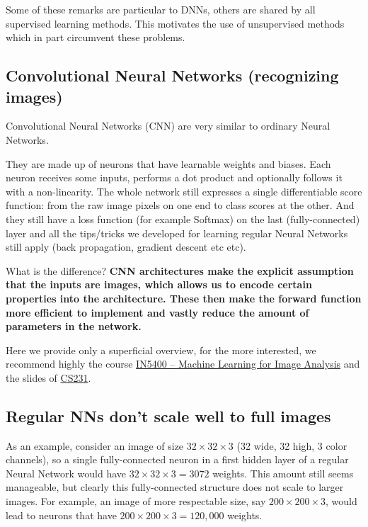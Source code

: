 \documentclass[%
oneside,                 %
final,                   %
10pt]{article}
\begin{document}
\noindent
Some of these remarks are particular to DNNs, others are shared by all supervised learning methods. This motivates the use of unsupervised methods which in part circumvent these problems.


\subsection*{Convolutional Neural Networks (recognizing images)}

Convolutional Neural Networks (CNN) are very similar to ordinary Neural Networks.

They are made up of neurons that have learnable weights and
biases. Each neuron receives some inputs, performs a dot product and
optionally follows it with a non-linearity. The whole network still
expresses a single differentiable score function: from the raw image
pixels on one end to class scores at the other. And they still have a
loss function (for example Softmax) on the last (fully-connected) layer
and all the tips/tricks we developed for learning regular Neural
Networks still apply (back propagation, gradient descent etc etc).

What is the difference? \textbf{CNN architectures make the explicit assumption that
the inputs are images, which allows us to encode certain properties
into the architecture. These then make the forward function more
efficient to implement and vastly reduce the amount of parameters in
the network.}

Here we provide only a superficial overview, for the more interested, we recommend highly the course
\href{{https://www.uio.no/studier/emner/matnat/ifi/IN5400/index-eng.html}}{IN5400 – Machine Learning for Image Analysis}
and the slides of \href{{http://cs231n.github.io/convolutional-networks/}}{CS231}.

\subsection*{Regular NNs don’t scale well to full images}

As an example, consider
an image of size $32\times 32\times 3$ (32 wide, 32 high, 3 color channels), so a
single fully-connected neuron in a first hidden layer of a regular
Neural Network would have $32\times 32\times 3 = 3072$ weights. This amount still
seems manageable, but clearly this fully-connected structure does not
scale to larger images. For example, an image of more respectable
size, say $200\times 200\times 3$, would lead to neurons that have 
$200\times 200\times 3 = 120,000$ weights. 
\end{document}
